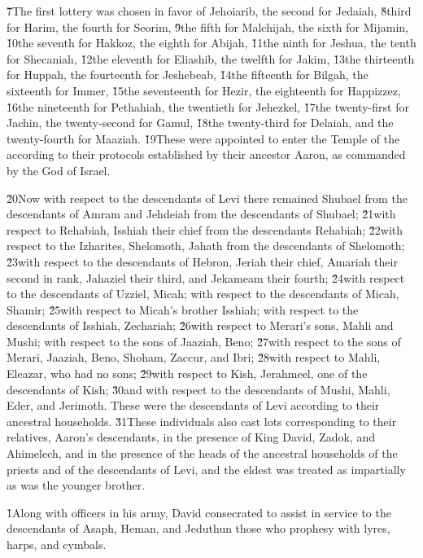 \v{7}The first lottery was chosen in favor of Jehoiarib, the second for Jedaiah, \v{8}third for Harim, the fourth for Seorim, \v{9}the fifth for Malchijah, the sixth for Mijamin, \v{10}the seventh for Hakkoz, the eighth for Abijah, \v{11}the ninth for Jeshua, the tenth for Shecaniah, \v{12}the eleventh for Eliashib, the twelfth for Jakim, \v{13}the thirteenth for Huppah, the fourteenth for Jeshebeab, \v{14}the fifteenth for Bilgah, the sixteenth for Immer, \v{15}the seventeenth for Hezir, the eighteenth for Happizzez, \v{16}the nineteenth for Pethahiah, the twentieth for Jehezkel, \v{17}the twenty-first for Jachin, the twenty-second for Gamul, \v{18}the twenty-third for Delaiah, and the twenty-fourth for Maaziah. \v{19}These were appointed to enter the Temple of the  according to their protocols established by their ancestor Aaron, as commanded by the  God of Israel.

\v{20}Now with respect to the descendants of Levi there remained Shubael from the descendants of Amram and Jehdeiah from the descendants of Shubael; \v{21}with respect to Rehabiah, Isshiah their chief from the descendants Rehabiah; \v{22}with respect to the Izharites, Shelomoth, Jahath from the descendants of Shelomoth; \v{23}with respect to the descendants of Hebron, Jeriah their chief, Amariah their second in rank, Jahaziel their third, and Jekameam their fourth; \v{24}with respect to the descendants of Uzziel, Micah; with respect to the descendants of Micah, Shamir; \v{25}with respect to Micah's brother Isshiah; with respect to the descendants of Isshiah, Zechariah; \v{26}with respect to Merari's sons, Mahli and Mushi; with respect to the sons of Jaaziah, Beno; \v{27}with respect to the sons of Merari, Jaaziah, Beno, Shoham, Zaccur, and Ibri; \v{28}with respect to Mahli, Eleazar, who had no sons; \v{29}with respect to Kish, Jerahmeel, one of the descendants of Kish; \v{30}and with respect to the descendants of Mushi, Mahli, Eder, and Jerimoth. These were the descendants of Levi according to their ancestral households. \v{31}These individuals also cast lots corresponding to their relatives, Aaron's descendants, in the presence of King David, Zadok, and Ahimelech, and in the presence of the heads of the ancestral households of the priests and of the descendants of Levi, and the eldest was treated as impartially as was the younger brother.

\v{1}Along with officers in his army, David consecrated to assist in service to the descendants of Asaph, Heman, and Jeduthun those who prophesy with lyres, harps, and cymbals.

